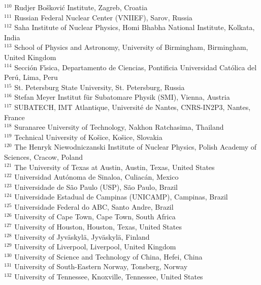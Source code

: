 \begin{flushleft}
$^{110}$ Rudjer Bo\v{s}kovi\'{c} Institute, Zagreb, Croatia\\
$^{111}$ Russian Federal Nuclear Center (VNIIEF), Sarov, Russia\\
$^{112}$ Saha Institute of Nuclear Physics, Homi Bhabha National Institute, Kolkata, India\\
$^{113}$ School of Physics and Astronomy, University of Birmingham, Birmingham, United Kingdom\\
$^{114}$ Secci\'{o}n F\'{\i}sica, Departamento de Ciencias, Pontificia Universidad Cat\'{o}lica del Per\'{u}, Lima, Peru\\
$^{115}$ St. Petersburg State University, St. Petersburg, Russia\\
$^{116}$ Stefan Meyer Institut f\"{u}r Subatomare Physik (SMI), Vienna, Austria\\
$^{117}$ SUBATECH, IMT Atlantique, Universit\'{e} de Nantes, CNRS-IN2P3, Nantes, France\\
$^{118}$ Suranaree University of Technology, Nakhon Ratchasima, Thailand\\
$^{119}$ Technical University of Ko\v{s}ice, Ko\v{s}ice, Slovakia\\
$^{120}$ The Henryk Niewodniczanski Institute of Nuclear Physics, Polish Academy of Sciences, Cracow, Poland\\
$^{121}$ The University of Texas at Austin, Austin, Texas, United States\\
$^{122}$ Universidad Aut\'{o}noma de Sinaloa, Culiac\'{a}n, Mexico\\
$^{123}$ Universidade de S\~{a}o Paulo (USP), S\~{a}o Paulo, Brazil\\
$^{124}$ Universidade Estadual de Campinas (UNICAMP), Campinas, Brazil\\
$^{125}$ Universidade Federal do ABC, Santo Andre, Brazil\\
$^{126}$ University of Cape Town, Cape Town, South Africa\\
$^{127}$ University of Houston, Houston, Texas, United States\\
$^{128}$ University of Jyv\"{a}skyl\"{a}, Jyv\"{a}skyl\"{a}, Finland\\
$^{129}$ University of Liverpool, Liverpool, United Kingdom\\
$^{130}$ University of Science and Technology of China, Hefei, China\\
$^{131}$ University of South-Eastern Norway, Tonsberg, Norway\\
$^{132}$ University of Tennessee, Knoxville, Tennessee, United States\\

\end{flushleft}
